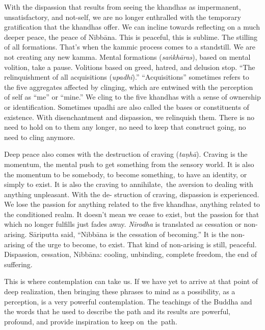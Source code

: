 With the dispassion that results from seeing the khandhas as impermanent, unsatisfactory, and not-self, we are no longer enthralled with the temporary gratification that the \linebreak khandhas offer. We can incline towards reflecting on a much deeper peace, the peace of Nibbāna. This is peaceful, this is sublime. The stilling of all formations. That's when the kammic process comes to a standstill. We are not creating any new kamma. Mental formations (\emph{saṅkhāras}), based on mental volition, take a pause. Volitions based on greed, hatred, and delusion stop. ``The relinquishment of all acquisitions (\emph{upadhi}).'' ``Acquisitions'' sometimes refers to the five aggregates affected by clinging, which are entwined with the perception of self as ``me'' or ``mine.'' We cling to the five khandhas with a sense of ownership or identification. Sometimes upadhi are also called the bases or constituents of existence. With disenchantment and dispassion, we relinquish them. There is no need to hold on to them any longer, no need to keep that construct going, no need to cling anymore.

Deep peace also comes with the destruction of craving (\emph{taṇhā}). Craving is the momentum, the mental push to get something from the sensory world. It is also the momentum to be somebody, to become something, to have an identity, or simply to exist. It is also the craving to \mbox{annihilate, the} aversion to dealing with anything unpleasant. With the de- \linebreak struction of craving, dispassion is experienced. We lose the passion for anything related to the five khandhas, anything related to the conditioned realm. It doesn't mean we cease to exist, but the passion for that which no longer fulfills just fades away. \emph{Nirodha} is translated as cessation or non-arising. Sāriputta said, ``Nibbāna is the cessation of becoming.'' It is the non-arising of the urge to become, to exist. That kind of non-arising is still, peaceful. Dispassion, cessation, Nibbāna: cooling, unbinding, complete freedom, the end of suffering.

This is where contemplation can take us. If we have yet to arrive at that point of deep realization, then bringing these phrases to mind as a possibility, as a perception, is a very powerful contemplation. The teachings of the Buddha and the words that he used to describe the path and its results are powerful, profound, and provide inspiration to keep \mbox{on the path.}
